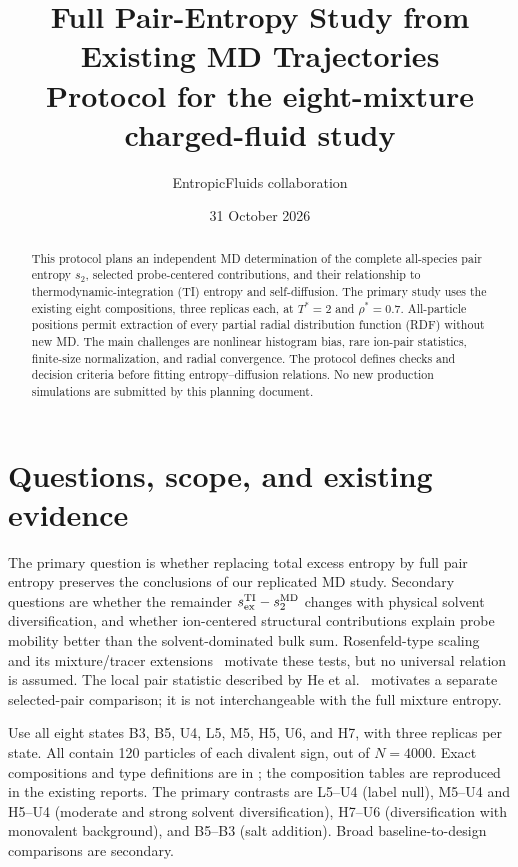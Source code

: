 \documentclass[11pt,a4paper]{article}
\title{Full Pair-Entropy Study from Existing MD Trajectories\\
\large Protocol for the eight-mixture charged-fluid study}
\author{EntropicFluids collaboration}
\date{31 October 2026}
\begin{document}
\maketitle
\begin{abstract}
This protocol plans an independent MD determination of the complete all-species
pair entropy $s_2$, selected probe-centered contributions, and their relationship
to thermodynamic-integration (TI) entropy and self-diffusion. The primary study
uses the existing eight compositions, three replicas each, at $T^*=2$ and
$\rho^*=0.7$. All-particle positions permit extraction of every partial radial
distribution function (RDF) without new MD. The main challenges are nonlinear
histogram bias, rare ion-pair statistics, finite-size normalization, and radial
convergence. The protocol defines checks and decision criteria before fitting
entropy--diffusion relations. No new production simulations are submitted by
this planning document.
\end{abstract}

\section{Questions, scope, and existing evidence}
The primary question is whether replacing total excess entropy by full pair
entropy preserves the conclusions of our replicated MD study. Secondary
questions are whether the remainder $s_{\rm ex}^{\rm TI}-s_2^{\rm MD}$ changes
with physical solvent diversification, and whether ion-centered structural
contributions explain probe mobility better than the solvent-dominated bulk
sum. Rosenfeld-type scaling~\cite{Rosenfeld1977} and its mixture/tracer
extensions~\cite{Krekelberg2009} motivate these tests, but no universal relation
is assumed. The local pair statistic described by He et al.~\cite{He2026}
motivates a separate selected-pair comparison; it is not interchangeable
with the full mixture entropy.

Use all eight states B3, B5, U4, L5, M5, H5, U6, and H7, with three replicas
per state. All contain 120 particles of each divalent sign, out of $N=4000$.
Exact compositions and type definitions are in
; the composition tables
are reproduced in the existing reports. The primary contrasts are L5--U4
(label null), M5--U4 and H5--U4 (moderate and strong solvent diversification),
H7--U6 (diversification with monovalent background), and B5--B3 (salt addition).
Broad baseline-to-design comparisons are secondary.
\end{document}
